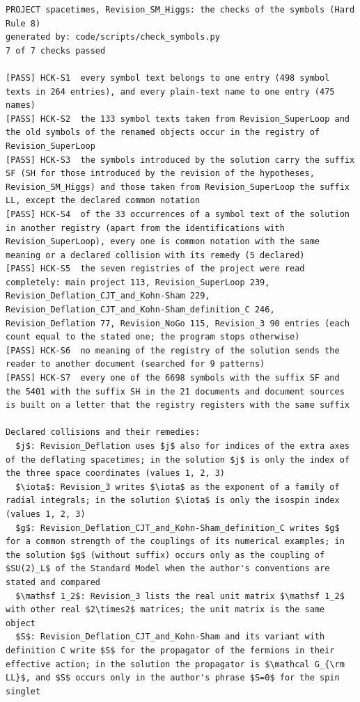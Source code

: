 \documentclass[
  10pt,
]{article}
\begin{document}
\begin{verbatim}
PROJECT spacetimes, Revision_SM_Higgs: the checks of the symbols (Hard Rule 8)
generated by: code/scripts/check_symbols.py
7 of 7 checks passed

[PASS] HCK-S1  every symbol text belongs to one entry (498 symbol texts in 264 entries), and every plain-text name to one entry (475 names)
[PASS] HCK-S2  the 133 symbol texts taken from Revision_SuperLoop and the old symbols of the renamed objects occur in the registry of Revision_SuperLoop
[PASS] HCK-S3  the symbols introduced by the solution carry the suffix SF (SH for those introduced by the revision of the hypotheses, Revision_SM_Higgs) and those taken from Revision_SuperLoop the suffix LL, except the declared common notation
[PASS] HCK-S4  of the 33 occurrences of a symbol text of the solution in another registry (apart from the identifications with Revision_SuperLoop), every one is common notation with the same meaning or a declared collision with its remedy (5 declared)
[PASS] HCK-S5  the seven registries of the project were read completely: main project 113, Revision_SuperLoop 239, Revision_Deflation_CJT_and_Kohn-Sham 229, Revision_Deflation_CJT_and_Kohn-Sham_definition_C 246, Revision_Deflation 77, Revision_NoGo 115, Revision_3 90 entries (each count equal to the stated one; the program stops otherwise)
[PASS] HCK-S6  no meaning of the registry of the solution sends the reader to another document (searched for 9 patterns)
[PASS] HCK-S7  every one of the 6698 symbols with the suffix SF and the 5401 with the suffix SH in the 21 documents and document sources is built on a letter that the registry registers with the same suffix

Declared collisions and their remedies:
  $j$: Revision_Deflation uses $j$ also for indices of the extra axes of the deflating spacetimes; in the solution $j$ is only the index of the three space coordinates (values 1, 2, 3)
  $\iota$: Revision_3 writes $\iota$ as the exponent of a family of radial integrals; in the solution $\iota$ is only the isospin index (values 1, 2, 3)
  $g$: Revision_Deflation_CJT_and_Kohn-Sham_definition_C writes $g$ for a common strength of the couplings of its numerical examples; in the solution $g$ (without suffix) occurs only as the coupling of $SU(2)_L$ of the Standard Model when the author's conventions are stated and compared
  $\mathsf 1_2$: Revision_3 lists the real unit matrix $\mathsf 1_2$ with other real $2\times2$ matrices; the unit matrix is the same object
  $S$: Revision_Deflation_CJT_and_Kohn-Sham and its variant with definition C write $S$ for the propagator of the fermions in their effective action; in the solution the propagator is $\mathcal G_{\rm LL}$, and $S$ occurs only in the author's phrase $S=0$ for the spin singlet
\end{verbatim}
\end{document}
